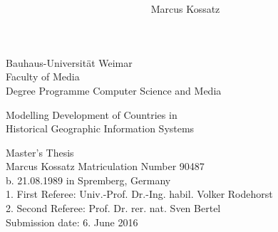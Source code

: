 \documentclass[11pt, a4paper]{report}
\title{\titleFirst \\ \titleSecond}
\author{Marcus Kossatz}
\date{\submissionDate}
\newcommand{\titleFirst}  {Modelling Development of Countries in}
\newcommand{\titleSecond} {Historical Geographic Information Systems}
\newcommand{\submissionDate}{6. June 2016}
\begin{document}

\begin{titlepage}

Bauhaus-Universität Weimar \\
Faculty of Media \\
Degree Programme Computer Science and Media \\ [2.0cm]

\begin{center}

{\huge \titleFirst} \\[0.5cm]
{\huge \titleSecond} \\[3.5cm]
\end{center}

{\LARGE Master's Thesis} \\[1.0cm]

Marcus Kossatz \hfill Matriculation Number 90487 \\
b. 21.08.1989 in Spremberg, Germany \\

1. First Referee: Univ.-Prof. Dr.-Ing. habil. Volker Rodehorst \\
2. Second Referee: Prof. Dr. rer. nat. Sven Bertel \\

\vfill
Submission date: \submissionDate

\end{titlepage}



\tableofcontents

\listoffigures
\listoftables
















{\footnotesize{
  {}
}}





\end{document}
